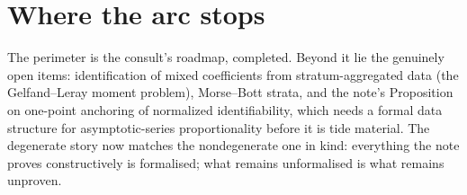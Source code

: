\documentclass[11pt]{article}
\begin{document}
\section{Where the arc stops}

The perimeter is the consult's roadmap, completed. Beyond it lie
the genuinely open items: identification of mixed coefficients from
stratum-aggregated data (the Gelfand--Leray moment problem),
Morse--Bott strata, and the note's Proposition on one-point
anchoring of normalized identifiability, which needs a formal data
structure for asymptotic-series proportionality before it is tide
material. The degenerate story now matches the nondegenerate one in
kind: everything the note proves constructively is formalised;
what remains unformalised is what remains unproven.
\end{document}
